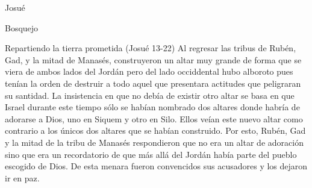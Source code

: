 \begin{section}{Josué}
\begin{subsection}{Bosquejo}
\begin{subsubsection}{Repartiendo la tierra prometida (Josué 13-22)}
		Al regresar las tribus de Rubén, Gad, y la mitad de Manasés, construyeron un altar muy grande de forma que se viera de ambos lados del Jordán pero del lado occiddental hubo alboroto pues tenían la orden de destruir a todo aquel que presentara actitudes que peligraran su santidad. La insistencia en que no debía de existir otro altar se basa en que Israel durante este tiempo sólo se habían nombrado dos altares donde habría de adorarse a Dios, uno en Siquem y otro en Silo. Ellos veían este nuevo altar como contrario a los únicos dos altares que se habían construido. Por esto, Rubén, Gad y la mitad de la tribu de Manasés respondieron que no era un altar de adoración sino que era un recordatorio de que más allá del Jordán había parte del pueblo escogido de Dios.	De esta menara fueron convencidos sus acusadores y los dejaron ir en paz.\\


\end{subsubsection}
\end{subsection}
\end{section}
